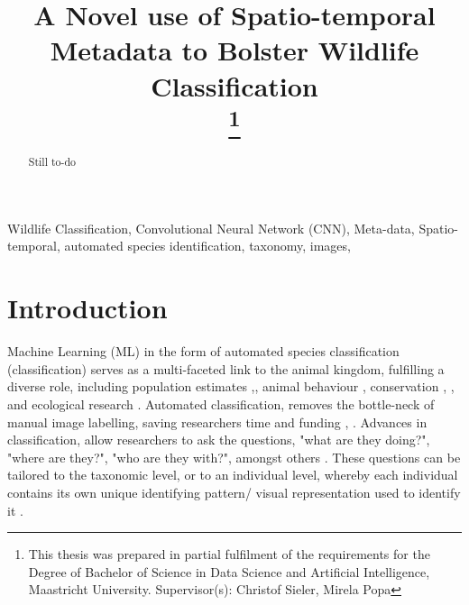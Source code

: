 \documentclass[conference]{IEEEtran}
\begin{document}
\title{A Novel use of Spatio-temporal Metadata to Bolster Wildlife Classification\\
\thanks{This thesis was prepared in partial fulfilment of the requirements for the Degree of Bachelor of Science in Data Science and Artificial Intelligence, Maastricht University. Supervisor(s): Christof Sieler, Mirela Popa}
}

\author{
}

\maketitle

\begin{abstract}
    Still to-do
\end{abstract}

\begin{IEEEkeywords}
Wildlife Classification, Convolutional Neural Network (CNN), Meta-data, Spatio-temporal, automated species identification, taxonomy, images, 
\end{IEEEkeywords}

\section{Introduction}
    Machine Learning (ML) in the form of automated species classification (classification) serves as a multi-faceted link to the animal kingdom, fulfilling a diverse role, including population estimates \cite{Miao_Gaynor_Wang_Liu_Muellerklein_Norouzzadeh_McInturff_Bowie_Nathan_Yu_2019},\cite{Schneider_Greenberg_Taylor_Kremer_2020}, animal behaviour \cite{Chen_Little_Mihaylova_Delahay_Cox_2019}, conservation \cite{Wäldchen_Mäder_2018}, \cite{Simões_Bouveyron_Precioso_2023}, and ecological research \cite{Nazir_Kaleem_2021} . Automated classification, removes the bottle-neck of manual image labelling, saving researchers time and funding \cite{Chen_Little_Mihaylova_Delahay_Cox_2019}, \cite{Miao_Gaynor_Wang_Liu_Muellerklein_Norouzzadeh_McInturff_Bowie_Nathan_Yu_2019}.
    Advances in classification, allow researchers to ask the questions, "what are they doing?", "where are they?", "who are they with?", amongst others \cite{Gomez_Villa_Salazar_Vargas_2017}. These questions can be tailored to the taxonomic level, or to an individual level, whereby each individual contains its own unique identifying pattern/ visual representation used to identify it \cite{Clapham_Miller_Nguyen_Van_Horn_2022}. 
    \\
\end{document}
